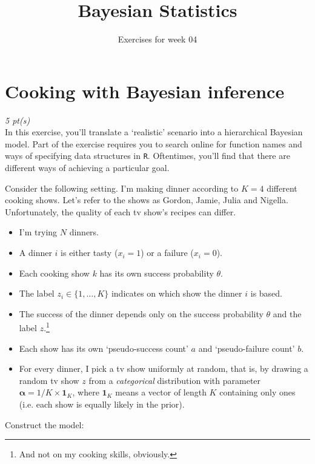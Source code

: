 \documentclass[a4paper]{article}
\title{Bayesian Statistics}
\author{Exercises for week 04}
\date{\vspace{-5ex}}
\newcommand{\score}[1]{ \noindent \emph{#1 pt(s)}\\}
\renewcommand{\v}[1]{\mathbf{\bm #1}}
\begin{document}
\maketitle


\section{Cooking with Bayesian inference}
\score{5}

In this exercise, you'll translate a `realistic' scenario into a hierarchical Bayesian model. Part of the exercise requires you to search online for function names and ways of specifying data structures in \texttt{R}. Oftentimes, you'll find that there are different ways of achieving a particular goal.

Consider the following setting. I'm making dinner according to $K=4$ different cooking shows. Let's refer to the shows as Gordon, Jamie, Julia and Nigella. Unfortunately, the quality of each tv show's recipes can differ.

\begin{itemize}
    \item I'm trying $N$ dinners.
    \item A dinner $i$ is either tasty ($x_i=1$) or a failure ($x_i=0$).
    \item Each cooking show $k$ has its own success probability $\theta$.
    \item The label $z_i \in \{1, \ldots, K\}$ indicates on which show the dinner $i$ is based.
    \item The success of the dinner depends only on the success probability $\theta$ and the label $z$.\footnote{And not on my cooking skills, obviously.}
    \item Each show has its own `pseudo-success count' $a$ and `pseudo-failure count' $b$.
    \item For every dinner, I pick a tv show uniformly at random, that is, by drawing a random tv show $z$ from a \emph{categorical} distribution with parameter $\v{\alpha}=1/K \times \v{1}_K$, where $\v{1}_K$ means a vector of length $K$ containing only ones (i.e. each show is equally likely in the prior).
\end{itemize}

Construct the model:
\end{document}
